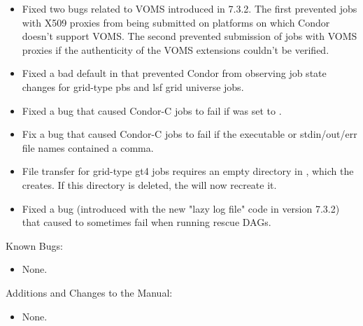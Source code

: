 \begin{itemize}
\item Fixed two bugs related to VOMS introduced in 7.3.2. The first
prevented jobs with X509 proxies from being submitted on platforms
on which Condor doesn't support VOMS. The second prevented submission
of jobs with VOMS proxies if the authenticity of the VOMS extensions
couldn't be verified.

\item Fixed a bad default in  that prevented
Condor from observing job state changes for grid-type pbs and lsf grid
universe jobs.

\item Fixed a bug that caused Condor-C jobs to fail if
 was set to .

\item Fix a bug that caused Condor-C jobs to fail if the executable
or stdin/out/err file names contained a comma.

\item File transfer for grid-type gt4 jobs requires an empty directory
in , which the  creates. If this directory
is deleted, the  will now recreate it.

\item Fixed a bug (introduced with the new "lazy log file" code in
version 7.3.2) that caused  to sometimes fail when
running rescue DAGs.

\end{itemize}

\noindent Known Bugs:

\begin{itemize}

\item None.

\end{itemize}

\noindent Additions and Changes to the Manual:

\begin{itemize}

\item None.

\end{itemize}

